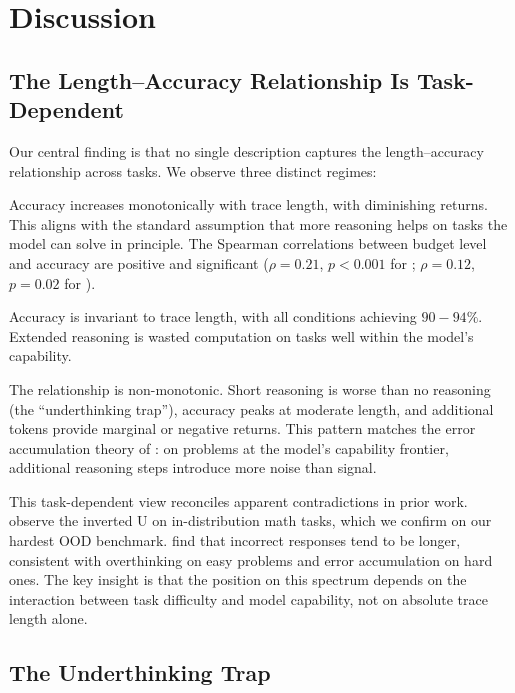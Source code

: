 \section{Discussion}
\label{sec:discussion}

\subsection{The Length--Accuracy Relationship Is Task-Dependent}
\label{sec:discussion:task}

Our central finding is that no single description captures the length--accuracy relationship across tasks. We observe three distinct regimes:

 Accuracy increases monotonically with trace length, with diminishing returns. This aligns with the standard assumption that more reasoning helps on tasks the model can solve in principle. The Spearman correlations between budget level and accuracy are positive and significant ($\rho{=}0.21$, $p{<}0.001$ for \math; $\rho{=}0.12$, $p{=}0.02$ for \mmlupro).

 Accuracy is invariant to trace length, with all conditions achieving $90{-}94\%$. Extended reasoning is wasted computation on tasks well within the model's capability.

 The relationship is non-monotonic. Short reasoning is worse than no reasoning (the ``underthinking trap''), accuracy peaks at moderate length, and additional tokens provide marginal or negative returns. This pattern matches the error accumulation theory of \citet{wu2025more}: on problems at the model's capability frontier, additional reasoning steps introduce more noise than signal.

This task-dependent view reconciles apparent contradictions in prior work. \citet{wu2025more} observe the inverted U on in-distribution math tasks, which we confirm on our hardest OOD benchmark. \citet{su2025underthinking} find that incorrect responses tend to be longer, consistent with overthinking on easy problems and error accumulation on hard ones. The key insight is that the position on this spectrum depends on the interaction between task difficulty and model capability, not on absolute trace length alone.

\subsection{The Underthinking Trap}
\label{sec:discussion:trap}

